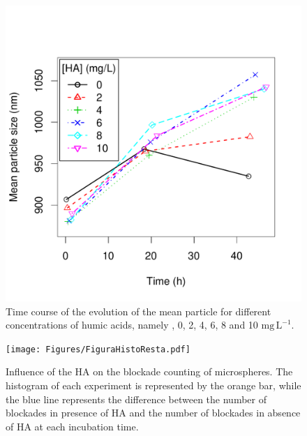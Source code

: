 \documentclass[journal=langd5,manuscript=article]{achemso}
\begin{document}
 \begin{figure}
  \includegraphics[width=\linewidth]{Figures/mean_particle_size.pdf}
  \caption{Time course of the evolution of the mean particle for different concentrations of humic acids, namely , 0, 2, 4, 6, 8 and 10 $\mathrm{mg\,L^{-1}}$.} 
  \label{fgr:meansize}
\end{figure}





 
 \begin{figure}
  \texttt{[image: Figures/FiguraHistoResta.pdf]}
  \caption{Influence of the HA on the blockade counting of microspheres. The histogram of each experiment is represented by the orange bar, while the blue line represents the difference between the number of blockades in presence of HA and the number of blockades in absence of HA at each incubation time.} 
\label{fgr:FiguraHistoResta}
\end{figure}

% 
% 
\end{document}

